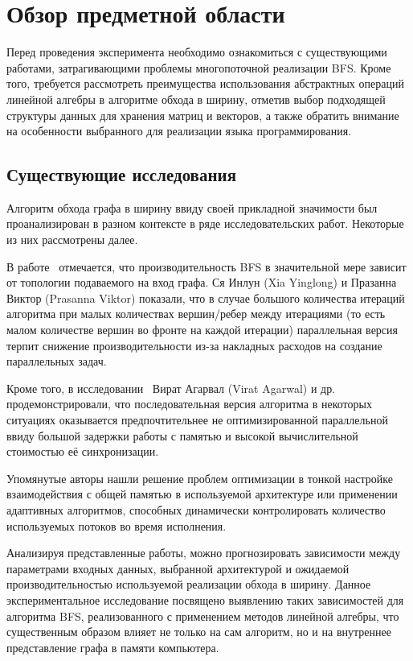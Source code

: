 
\section{Обзор предметной области}
\label{sec:relatedworks}
\noindent Перед проведения эксперимента необходимо ознакомиться с существующими работами, затрагивающими проблемы многопоточной реализации BFS. Кроме того, требуется рассмотреть преимущества использования абстрактных операций линейной алгебры в алгоритме обхода в ширину, отметив выбор подходящей структуры данных для хранения матриц и векторов, а также обратить внимание на особенности выбранного для реализации языка программирования.



\subsection{Существующие исследования}
Алгоритм обхода графа в ширину ввиду своей прикладной значимости был проанализирован в разном контексте в ряде исследовательских работ. Некоторые из них рассмотрены далее.

В работе~\cite{adaptiveBFS} отмечается, что производительность BFS в значительной мере зависит от топологии подаваемого на вход графа. Ся Инлун (Xia Yinglong) и Празанна Виктор (Prasanna Viktor) показали, что в случае большого количества итераций алгоритма при малых количествах вершин/ребер между итерациями (то есть малом количестве вершин во фронте на каждой итерации) параллельная версия терпит снижение производительности из-за накладных расходов на создание параллельных задач.

Кроме того, в исследовании~\cite{scalableBFS} Вират Агарвал (Virat Agarwal) и др. продемонстрировали, что последовательная версия алгоритма в некоторых ситуациях оказывается предпочтительнее не оптимизированной параллельной ввиду большой задержки работы с памятью и высокой вычислительной стоимостью её синхронизации. 

Упомянутые авторы нашли решение проблем оптимизации в тонкой настройке взаимодействия с общей памятью в используемой архитектуре или применении адаптивных алгоритмов, способных динамически контролировать количество используемых потоков во время исполнения.

Анализируя представленные работы, можно прогнозировать зависимости между параметрами входных данных, выбранной архитектурой и ожидаемой производительностью используемой реализации обхода в ширину. Данное экспериментальное исследование посвящено выявлению таких зависимостей для алгоритма BFS, реализованного с применением методов линейной алгебры, что существенным образом влияет не только на сам алгоритм, но и на внутреннее представление графа в памяти компьютера.



